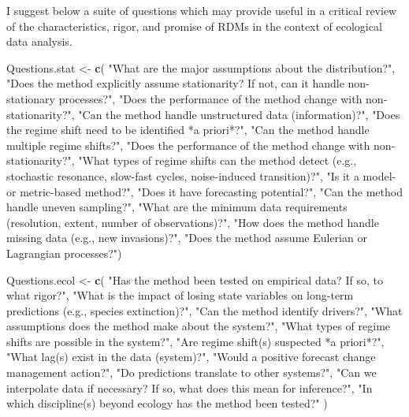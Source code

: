 \documentclass[12pt,twoside,openany]{reedthesis}
\newenvironment{Shaded}{\begin{snugshade}}{\end{snugshade}}
\newcommand{\KeywordTok}[1]{\textcolor[rgb]{0.13,0.29,0.53}{\textbf{#1}}}
\newcommand{\StringTok}[1]{\textcolor[rgb]{0.31,0.60,0.02}{#1}}
\newcommand{\NormalTok}[1]{#1}
\begin{document}
I suggest below a suite of questions which may provide useful in a
critical review of the characteristics, rigor, and promise of RDMs in
the context of ecological data analysis.
\begin{Shaded}
\begin{Highlighting}[]
\NormalTok{Questions.stat <-}\StringTok{ }\KeywordTok{c}\NormalTok{(}
  \StringTok{"What are the major assumptions about the distribution?"}\NormalTok{,}
  \StringTok{"Does the method explicitly assume stationarity? If not, can it handle non-stationary processes?"}\NormalTok{, }
  \StringTok{"Does the performance of the method change with non-stationarity?"}\NormalTok{,}
  \StringTok{"Can the method handle unstructured data (information)?"}\NormalTok{,}
  \StringTok{"Does the regime shift need to be identified *a priori*?"}\NormalTok{,}
  \StringTok{"Can the method handle multiple regime shifts?"}\NormalTok{,}
  \StringTok{"Does the performance of the method change with non-stationarity?"}\NormalTok{,}
  \StringTok{"What types of regime shifts can the method detect (e.g., stochastic resonance, slow-fast cycles, noise-induced transition)?"}\NormalTok{,}
  \StringTok{"Is it a model- or metric-based method?"}\NormalTok{, }
  \StringTok{"Does it have forecasting potential?"}\NormalTok{,}
  \StringTok{"Can the method handle uneven sampling?"}\NormalTok{,}
  \StringTok{"What are the minimum data requirements (resolution, extent, number of observations)?"}\NormalTok{,}
  \StringTok{"How does the method handle missing data (e.g., new invasions)?"}\NormalTok{, }
  \StringTok{"Does the method assume Eulerian or Lagrangian processes?"}\NormalTok{)}

\NormalTok{Questions.ecol <-}\StringTok{ }\KeywordTok{c}\NormalTok{(}
  \StringTok{"Has the method been tested on empirical data? If so, to what rigor?"}\NormalTok{,}
  \StringTok{"What is the impact of losing state variables on long-term predictions (e.g., species extinction)?"}\NormalTok{,}
  \StringTok{"Can the method identify drivers?"}\NormalTok{,}
  \StringTok{"What assumptions does the method make about the system?"}\NormalTok{, }
  \StringTok{"What types of regime shifts are possible in the system?"}\NormalTok{, }
  \StringTok{"Are regime shift(s) suspected *a priori*?"}\NormalTok{,}
  \StringTok{"What lag(s) exist in the data (system)?"}\NormalTok{,}
  \StringTok{"Would a positive forecast change management action?"}\NormalTok{,}
  \StringTok{"Do predictions translate to other systems?"}\NormalTok{,}
  \StringTok{"Can we interpolate data if necessary? If so, what does this mean for inference?"}\NormalTok{,}
  \StringTok{"In which discipline(s) beyond ecology has the method been tested?"}
\NormalTok{  )}


\end{Highlighting}
\end{Shaded}
\end{document}
